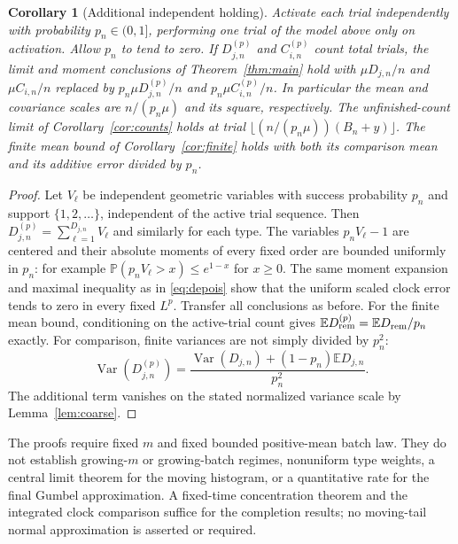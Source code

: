 \documentclass[11pt]{article}
\newtheorem{corollary}[theorem]{Corollary}
\theoremstyle{remark}\newtheorem{remark}[theorem]{Remark}
\newcommand{\Pbb}{\mathbb P}
\newcommand{\Ebb}{\mathbb E}
\newcommand{\Var}{\operatorname{Var}}
\begin{document}
\begin{corollary}[Additional independent holding]\label{cor:holding}
Activate each trial independently with probability $p_n\in(0,1]$, performing
one trial of the model above only on activation. Allow $p_n$ to tend to zero.
If $D^{(p)}_{j,n}$ and $C^{(p)}_{i,n}$ count total trials, the limit and
moment conclusions of Theorem~\ref{thm:main} hold with
$\mu D_{j,n}/n$ and $\mu C_{i,n}/n$ replaced by
$p_n\mu D^{(p)}_{j,n}/n$ and $p_n\mu C^{(p)}_{i,n}/n$.
In particular the mean and covariance scales are $n/(p_n\mu)$ and its
square, respectively. The unfinished-count limit of
Corollary~\ref{cor:counts} holds at trial
$\lfloor(n/(p_n\mu))(B_n+y)\rfloor$.
The finite mean bound of Corollary~\ref{cor:finite} holds with both its
comparison mean and its additive error divided by $p_n$.
\end{corollary}
\begin{proof}
Let $V_\ell$ be independent geometric variables with success probability
$p_n$ and support $\{1,2,\ldots\}$, independent of the active trial sequence.
Then $D^{(p)}_{j,n}=\sum_{\ell=1}^{D_{j,n}}V_\ell$ and similarly for each
type. The variables $p_nV_\ell-1$ are centered and their absolute moments
of every fixed order are bounded uniformly in $p_n$: for example
$\Pbb(p_nV_\ell>x)\le e^{1-x}$ for $x\ge0$.
The same moment expansion and maximal inequality as in
\eqref{eq:depois} show that the uniform scaled clock error tends to zero in
every fixed $L^p$. Transfer all conclusions as before.
For the finite mean bound, conditioning on the active-trial count gives
$\Ebb D^{(p)}_{\rm rem}=\Ebb D_{\rm rem}/p_n$ exactly.
For comparison, finite variances are not simply divided by $p_n^2$:
\[
 \Var(D^{(p)}_{j,n})=
 \frac{\Var(D_{j,n})+(1-p_n)\Ebb D_{j,n}}{p_n^2}.
\]
The additional term vanishes on the stated normalized variance scale by
Lemma~\ref{lem:coarse}.
\end{proof}

The proofs require fixed $m$ and fixed bounded positive-mean batch law.
They do not establish growing-$m$ or growing-batch regimes, nonuniform type
weights, a central limit theorem for the moving histogram, or a quantitative
rate for the final Gumbel approximation. A fixed-time concentration theorem
and the integrated clock comparison suffice for the completion results;
no moving-tail normal approximation is asserted or required.
\end{document}
